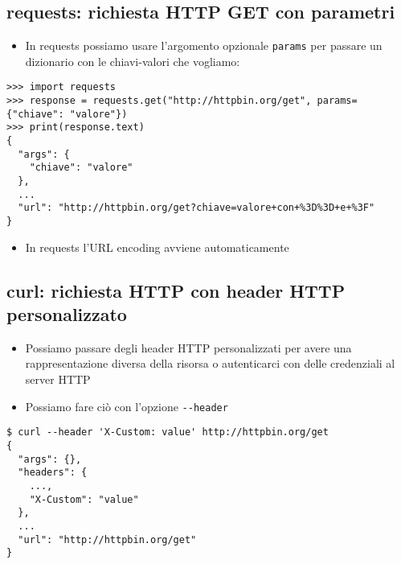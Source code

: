 \documentclass{beamer}
\newcommand{\code}[1]{\mbox{\texttt{#1}}}
\begin{document}
\subsection*{requests: richiesta HTTP GET con parametri}
\begin{frame}{\insertsection}{\insertsubsection}
\begin{itemize}
\item In requests possiamo usare l'argomento opzionale \code{params} per
passare un dizionario con le chiavi-valori che vogliamo:
\end{itemize}
{\tiny
\begin{verbatim}
>>> import requests
>>> response = requests.get("http://httpbin.org/get", params={"chiave": "valore"})
>>> print(response.text)
{
  "args": {
    "chiave": "valore"
  },
  ...
  "url": "http://httpbin.org/get?chiave=valore+con+%3D%3D+e+%3F"
}
\end{verbatim}
}
\begin{itemize}
\item In requests l'URL encoding avviene automaticamente
\end{itemize}
\end{frame}

\subsection*{curl: richiesta HTTP con header HTTP personalizzato}
\begin{frame}{\insertsection}{\insertsubsection}
\begin{itemize}
\item Possiamo passare degli header HTTP personalizzati per avere una
rappresentazione diversa della risorsa o autenticarci con delle credenziali
al server HTTP
\item Possiamo fare ciò con l'opzione \verb|--header|
\end{itemize}
{\tiny
\begin{verbatim}
$ curl --header 'X-Custom: value' http://httpbin.org/get
{
  "args": {},
  "headers": {
    ...,
    "X-Custom": "value"
  },
  ...
  "url": "http://httpbin.org/get"
}
\end{verbatim}
}
\end{frame}
\end{document}
